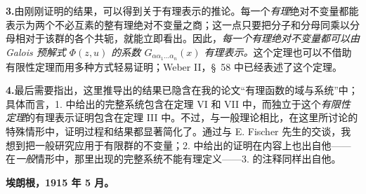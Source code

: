 \noindent\textbf{3.}\enspace 由刚刚证明的结果，可以得到关于有理表示的推论。每一个\emph{有理}绝对不变量都能表示为两个不必互素的整有理绝对不变量之商；这一点只要把分子和分母同乘以分母相对于该群的各个共轭，就能立即看出。因此，\emph{每一个有理绝对不变量都可以由 Galois 预解式 $\Phi(z,u)$ 的系数 $G_{\alpha\alpha_1\ldots\alpha_n}(x)$ 有理表示。}这个定理也可以不借助有限性定理而用多种方式轻易证明；Weber II，\S\ 58 中已经表述了这个定理。

\newpage
\noindent\textbf{4.}\enspace 最后需要指出，这里推导出的结果已隐含在我的论文“有理函数的域与系统”中；具体而言，1. 中给出的完整系统包含在定理 VI 和 VII 中，而独立于这个\emph{有限性定理}的有理表示证明包含在定理 III 中。不过，与一般理论相比，在这里所讨论的特殊情形中，证明过程和结果都显著简化了。通过与 E. Fischer 先生的交谈，我想到把一般研究应用于有限群的不变量；2. 中给出的证明在内容上也出自他——在\emph{一般}情形中，那里出现的完整系统不能有理定义——3. 的注释同样出自他。

\textbf{埃朗根，1915 年 5 月。}

\clearpage

